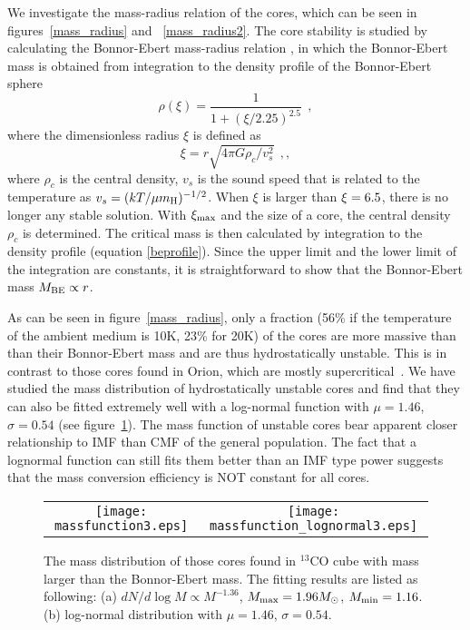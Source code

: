 \documentclass[12pt,preprint]{aastex}
\def\lc{\>\> ,}
\begin{document}
We investigate the mass-radius relation of the cores, which can be seen in figures~\ref{mass_radius} and ~\ref{mass_radius2}.
The core stability is studied by calculating the
Bonnor-Ebert mass-radius relation \citep{core_mass_function}, in which the Bonnor-Ebert mass is obtained from integration to the density profile of
the Bonnor-Ebert sphere
\begin{equation}
\rho(\xi)=\frac{1}{1+(\xi/2.25)^{2.5}}\lc
\label{beprofile}
\end{equation}
where the dimensionless radius $\xi$ is defined as
\begin{equation}
\xi=r\sqrt{4\pi G\rho_c/v_s^2} \lc,
\end{equation}
where $\rho_c$ is the central density, $v_s$ is the sound speed that is related to the temperature as $v_s=(kT/\mu m_{\rm H})^{-1/2}$.
When $\xi$ is larger than $\xi_{\rm}=6.5$, there is no longer any stable solution. With $\xi_{\rm max}$ and the size of a core,
the central density $\rho_{c}$
is determined. The critical mass is then calculated by integration to the density profile (equation \ref{beprofile}).
Since the upper limit and the lower limit of the integration are constants, it is straightforward to show that the Bonnor-Ebert mass
$M_{\rm BE}\propto r$.

As can be seen in figure~\ref{mass_radius}, only a fraction (56\% if the temperature of
the ambient medium is 10K, 23\% for 20K) of the cores are more massive than than their Bonnor-Ebert mass and are thus hydrostatically unstable. This is in contrast to those cores found in Orion, which are mostly supercritical~\citep{core_mass_function}. We have studied the mass
distribution of hydrostatically unstable cores and find that they can also be fitted extremely well with a log-normal function with $\mu=1.46$, $\sigma=0.54$ (see figure~\ref{massfunction_be}). The mass function of unstable cores bear
apparent closer relationship to IMF than CMF of the general population. The fact that a lognormal function can still fits them better than an IMF type power suggests that the mass conversion efficiency is NOT constant for all cores.

\begin{figure}[htb]
\begin{tabular}{cc}
\texttt{[image: massfunction3.eps]} & \texttt{[image: massfunction\_lognormal3.eps]}\\
\end{tabular}
\caption{ The mass distribution of those cores found in $^{13}$CO cube with mass larger than the Bonnor-Ebert mass.
The fitting results are listed as following:
(a) $dN/d\log M\propto M^{-1.36}$, $M_{\rm max}=1.96 M_{\odot}$, $M_{\rm min}=1.16$.
(b) log-normal distribution with $\mu=1.46$, $\sigma=0.54$.
\label{massfunction_be}}
\end{figure}
\end{document}

